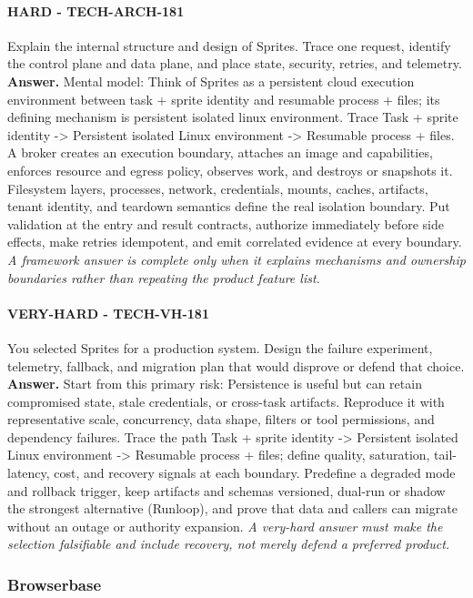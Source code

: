 \paragraph{HARD - TECH-ARCH-181} Explain the internal structure and design of Sprites. Trace one request, identify the control plane and data plane, and place state, security, retries, and telemetry.
\textbf{Answer.} Mental model: Think of Sprites as a persistent cloud execution environment between task + sprite identity and resumable process + files; its defining mechanism is persistent isolated linux environment. Trace Task + sprite identity -> Persistent isolated Linux environment -> Resumable process + files. A broker creates an execution boundary, attaches an image and capabilities, enforces resource and egress policy, observes work, and destroys or snapshots it. Filesystem layers, processes, network, credentials, mounts, caches, artifacts, tenant identity, and teardown semantics define the real isolation boundary. Put validation at the entry and result contracts, authorize immediately before side effects, make retries idempotent, and emit correlated evidence at every boundary.
\textit{A framework answer is complete only when it explains mechanisms and ownership boundaries rather than repeating the product feature list.}
\paragraph{VERY-HARD - TECH-VH-181} You selected Sprites for a production system. Design the failure experiment, telemetry, fallback, and migration plan that would disprove or defend that choice.
\textbf{Answer.} Start from this primary risk: Persistence is useful but can retain compromised state, stale credentials, or cross-task artifacts. Reproduce it with representative scale, concurrency, data shape, filters or tool permissions, and dependency failures. Trace the path Task + sprite identity -> Persistent isolated Linux environment -> Resumable process + files; define quality, saturation, tail-latency, cost, and recovery signals at each boundary. Predefine a degraded mode and rollback trigger, keep artifacts and schemas versioned, dual-run or shadow the strongest alternative (Runloop), and prove that data and callers can migrate without an outage or authority expansion.
\textit{A very-hard answer must make the selection falsifiable and include recovery, not merely defend a preferred product.}
\subsubsection*{Browserbase}
